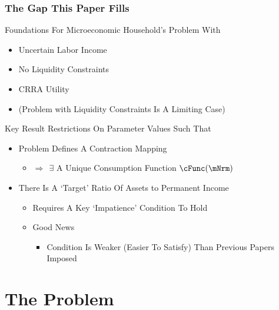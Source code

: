 \documentclass[pdflatex]{beamer}
\begin{document}
\begin{frame}
\frametitle{The Gap This Paper Fills}

\pause Foundations For Microeconomic Household's Problem With
\begin{itemize}
\item Uncertain Labor Income
\item No Liquidity Constraints
\item CRRA Utility
\item (Problem with Liquidity Constraints Is A Limiting Case)
\end{itemize}

\end{frame}
\begin{frame}{Key Result}
\pause
Restrictions On Parameter Values Such That \pause
\begin{itemize}
\item Problem Defines A Contraction Mapping
\begin{itemize}
\item $\Rightarrow~~\exists $ A Unique Consumption Function $\cFunc(\mNrm)$
\end{itemize}
\item There Is A `Target' Ratio Of Assets to Permanent Income
\begin{itemize}
\item Requires A Key `Impatience' Condition To Hold
\item Good News
\begin{itemize} \item Condition Is Weaker (Easier To Satisfy) Than Previous Papers Imposed \end{itemize}
\end{itemize}
\end{itemize}

\end{frame}

\section{The Problem}
\end{document}
